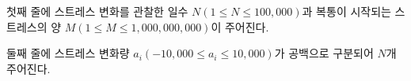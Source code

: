 첫째 줄에 스트레스 변화를 관찰한 일수 $N (1 \leq N \leq 100,000)$과 복통이 시작되는 스트레스의 양 $M (1 \leq M \leq 1,000,000,000)$이 주어진다.

둘째 줄에 스트레스 변화량 $a_i (-10,000 \leq a_i \leq 10,000)$가 공백으로 구분되어 $N$개 주어진다.